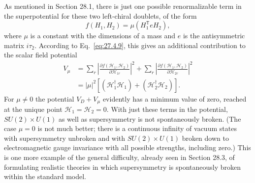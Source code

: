As mentioned in Section 28.1, there is just one possible renormalizable
term in the superpotential for these two left-chiral doublets, of the form
\begin{equation}
  f(H_1,H_2)=\mu\left(H_1^{\mathsf T}eH_2\right),
  \tag{28.5.7}\label{eq:28.5.7}
\end{equation}
where \(\mu\) is a constant with the dimensions of a mass and \(e\) is the
antisymmetric matrix \(i\tau_2\). According to Eq.~\eqref{eq:27.4.9},
this gives an additional contribution to the scalar field potential
\begin{equation}
  \begin{aligned}
  V_\mu
  &=
    \sum_r\left|
      \frac{\partial f(\mathcal{H}_1,\mathcal{H}_2)}
           {\partial\mathcal{H}_{1r}}
    \right|^2
    +\sum_r\left|
      \frac{\partial f(\mathcal{H}_1,\mathcal{H}_2)}
           {\partial\mathcal{H}_{2r}}
    \right|^2\\
  &=|\mu|^2
    \left[
      \left(\mathcal{H}_1^\dagger\mathcal{H}_1\right)
      +\left(\mathcal{H}_2^\dagger\mathcal{H}_2\right)
    \right].
  \end{aligned}
  \tag{28.5.8}\label{eq:28.5.8}
\end{equation}
For \(\mu\neq0\) the potential \(V_D+V_\mu\) evidently has a minimum value
of zero, reached at the unique point
\(\mathcal{H}_1=\mathcal{H}_2=0\). With just these terms in the potential,
\(SU(2)\times U(1)\) as well as supersymmetry is not spontaneously
broken. (The case \(\mu=0\) is not much better; there is a continuous
infinity of vacuum states with supersymmetry unbroken and with
\(SU(2)\times U(1)\) broken down to electromagnetic gauge
invariance with all possible strengths, including zero.) This is one more
example of the general difficulty, already seen in Section 28.3, of
formulating realistic theories in which supersymmetry is spontaneously
broken within the standard model.

